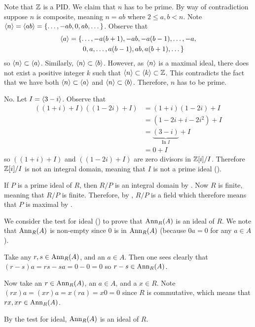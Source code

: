 \begin{questions}
    \item Note that $\mathbb{Z}$ is a PID. We claim that $n$ has to be prime. By way of contradiction suppose $n$ is composite, meaning $n = ab$ where $2 \leq a,b < n$. Note $\left\langle n\right\rangle = \left\langle ab\right\rangle = \{\dots, -ab, 0, ab, \dots\}$. Observe that
    \begin{align*}
        \left\langle a\right\rangle &= \{\dots, -a(b+1), -ab, -a(b-1), \dots, -a,\\
        &\quad\quad0, a, \dots, a(b-1), ab, a(b+1), \dots\}
    \end{align*}
    so $\left\langle n\right\rangle \subset \left\langle a\right\rangle$. Similarly, $\left\langle n\right\rangle \subset \left\langle b\right\rangle$. However, as $\left\langle n\right\rangle$ is a maximal ideal, there does not exist a positive integer $k$ such that $\left\langle n\right\rangle \subset \left\langle k\right\rangle \subset \mathbb{Z}$. This contradicts the fact that we have both $\left\langle n\right\rangle \subset \left\langle a\right\rangle$ and $\left\langle n\right\rangle \subset \left\langle b\right\rangle$. Therefore, $n$ has to be prime.

    \item No. Let $I = \left\langle3-i\right\rangle$. Observe that
    \begin{align*}
        ((1+i)+I)((1-2i)+I) &= (1+i)(1-2i) + I\\
        &= (1-2i+i-2i^2) + I\\
        &= \underbrace{(3 - i)}_{\text{In }I} + I\\
        &= 0 + I
    \end{align*}
    so $((1+i)+I)$ and $((1-2i)+I)$ are zero divisors in $\mathbb{Z}[i]/I$. Therefore $\mathbb{Z}[i]/I$ is not an integral domain, meaning that $I$ is not a prime ideal ().

    \item If $P$ is a prime ideal of $R$, then $R/P$ is an integral domain by . Now $R$ is finite, meaning that $R/P$ is finite. Therefore, by , $R/P$ is a field which therefore means that $P$ is maximal by .
    
    \item We consider the test for ideal () to prove that $\mathrm{Ann}_{R}(A)$ is an ideal of $R$. We note that $\mathrm{Ann}_{R}(A)$ is non-empty since 0 is in $\mathrm{Ann}_{R}(A)$ (because $0a = 0$ for any $a \in A$).

    Take any $r, s \in \mathrm{Ann}_{R}(A)$, and an $a \in A$. Then one sees clearly that $(r-s)a = rs - sa = 0 - 0 = 0$ so $r-s \in \mathrm{Ann}_{R}(A)$.

    Now take an $r \in \mathrm{Ann}_{R}(A)$, an $a \in A$, and a $x \in R$. Note $(rx)a = (xr)a = x(ra) = x0 = 0$ since $R$ is commutative, which means that $rx, xr \in \mathrm{Ann}_{R}(A)$.

    By the test for ideal, $\mathrm{Ann}_{R}(A)$ is an ideal of $R$.
\end{questions}


